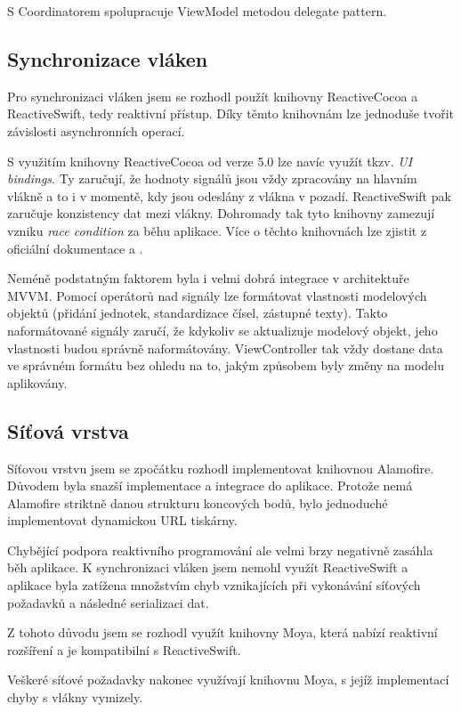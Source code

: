 S Coordinatorem spolupracuje ViewModel metodou delegate pattern.

\subsection{Synchronizace vláken}

Pro synchronizaci vláken jsem se rozhodl použít knihovny ReactiveCocoa a ReactiveSwift, tedy reaktivní přístup.
Díky těmto knihovnám lze jednoduše tvořit závislosti asynchronních operací.

S využitím knihovny ReactiveCocoa od verze 5.0 lze navíc využít tkzv. \textit{UI bindings}.
Ty zaručují, že hodnoty signálů jsou vždy zpracovány na hlavním vlákně a to i v momentě, kdy jsou odeslány z vlákna v pozadí.
ReactiveSwift pak zaručuje konzistency dat mezi vlákny.
Dohromady tak tyto knihovny zamezují vzniku \textit{race condition} za běhu aplikace.
Více o těchto knihovnách lze zjistit z oficiální dokumentace \cite{github-reactiveswift} a \cite{github-reactivecocoa}.

Neméně podstatným faktorem byla i velmi dobrá integrace v architektuře MVVM.
Pomocí operátorů nad signály lze formátovat vlastnosti modelových objektů (přidání jednotek, standardizace čísel, zástupné texty).
Takto naformátované signály zaručí, že kdykoliv se aktualizuje modelový objekt, jeho vlastnosti budou správně naformátovány.
ViewController tak vždy dostane data ve správném formátu bez ohledu na to, jakým způsobem byly změny na modelu aplikovány.

\subsection{Síťová vrstva}

Síťovou vrstvu jsem se zpočátku rozhodl implementovat knihovnou Alamofire.
Důvodem byla snazší implementace a integrace do aplikace.
Protože nemá Alamofire striktně danou strukturu koncových bodů, bylo jednoduché implementovat dynamickou URL tiskárny.

Chybějící podpora reaktivního programování ale velmi brzy negativně zasáhla běh aplikace.
K synchronizaci vláken jsem nemohl využít ReactiveSwift a aplikace byla zatížena množstvím chyb vznikajících při vykonávání síťových požadavků a následné serializaci dat.

Z tohoto důvodu jsem se rozhodl využít knihovny Moya, která nabízí reaktivní rozšíření a je kompatibilní s ReactiveSwift.

Veškeré síťové požadavky nakonec využívají knihovnu Moya, s jejíž implementací chyby s vlákny vymizely.


